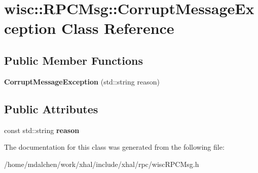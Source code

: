 \hypertarget{classwisc_1_1RPCMsg_1_1CorruptMessageException}{
\section{wisc::RPCMsg::CorruptMessageException Class Reference}
\label{classwisc_1_1RPCMsg_1_1CorruptMessageException}
}
\subsection*{Public Member Functions}
\begin{DoxyCompactItemize}
\item 
\hypertarget{classwisc_1_1RPCMsg_1_1CorruptMessageException_ad8c30f3632759bcbdc053a5d0aa7a95c}{
{\bfseries CorruptMessageException} (std::string reason)}
\label{classwisc_1_1RPCMsg_1_1CorruptMessageException_ad8c30f3632759bcbdc053a5d0aa7a95c}

\end{DoxyCompactItemize}
\subsection*{Public Attributes}
\begin{DoxyCompactItemize}
\item 
\hypertarget{classwisc_1_1RPCMsg_1_1CorruptMessageException_a7ec8aa17ee77dfbe5adeecb5fb93c9ee}{
const std::string {\bfseries reason}}
\label{classwisc_1_1RPCMsg_1_1CorruptMessageException_a7ec8aa17ee77dfbe5adeecb5fb93c9ee}

\end{DoxyCompactItemize}


The documentation for this class was generated from the following file:\begin{DoxyCompactItemize}
\item 
/home/mdalchen/work/xhal/include/xhal/rpc/wiscRPCMsg.h\end{DoxyCompactItemize}
